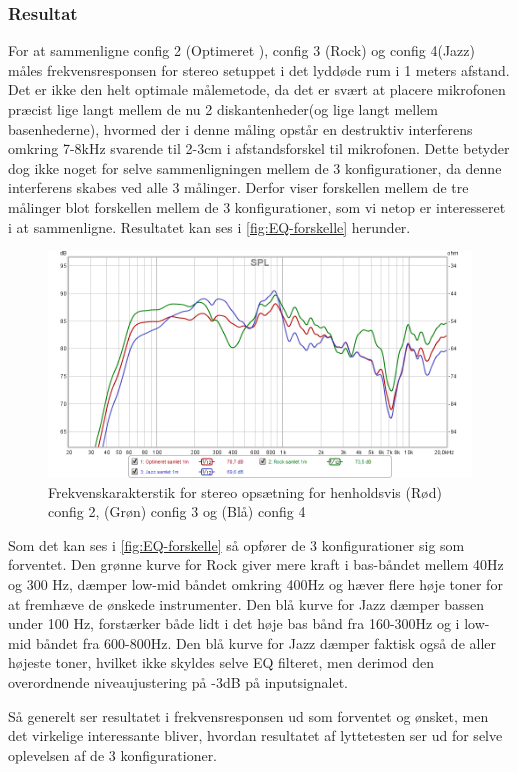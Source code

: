 \subsubsection{Resultat}
For at sammenligne config 2 (Optimeret ), config 3 (Rock) og config 4(Jazz) måles frekvensresponsen for stereo setuppet i det lyddøde rum i 1 meters afstand. Det er ikke den helt optimale målemetode, da det er svært at placere mikrofonen præcist lige langt mellem de nu 2 diskantenheder(og lige langt mellem basenhederne), hvormed der i denne måling opstår en destruktiv interferens omkring 7-8kHz svarende til 2-3cm i afstandsforskel til mikrofonen. Dette betyder dog ikke noget for selve sammenligningen mellem de 3 konfigurationer, da denne interferens skabes ved alle 3 målinger. Derfor viser forskellen mellem de tre målinger blot forskellen mellem de 3 konfigurationer, som vi netop er interesseret i at sammenligne. Resultatet kan ses i \autoref{fig:EQ-forskelle} herunder.


\begin{figure}[H]
	\center
	\includegraphics[width=1\textwidth]{figur/EQ-forskelle}
	\caption{Frekvenskarakterstik for stereo opsætning for henholdsvis (Rød) config 2, (Grøn) config 3 og (Blå) config 4}
	\label{fig:EQ-forskelle}
\end{figure}

Som det kan ses i \autoref{fig:EQ-forskelle} så opfører de 3 konfigurationer sig som forventet. Den grønne kurve for Rock giver mere kraft i  bas-båndet mellem 40Hz og 300 Hz, dæmper low-mid båndet omkring 400Hz og hæver flere høje toner for at fremhæve de ønskede instrumenter. Den blå kurve for Jazz dæmper bassen under 100 Hz, forstærker både lidt i det høje bas bånd fra 160-300Hz og i low-mid båndet fra 600-800Hz. Den blå kurve for Jazz dæmper faktisk også de aller højeste toner, hvilket ikke skyldes selve EQ filteret, men derimod den overordnende niveaujustering på -3dB på inputsignalet. 

Så generelt ser resultatet i frekvensresponsen ud som forventet og ønsket, men det virkelige interessante bliver, hvordan resultatet af lyttetesten ser ud for selve oplevelsen af de 3 konfigurationer.     



